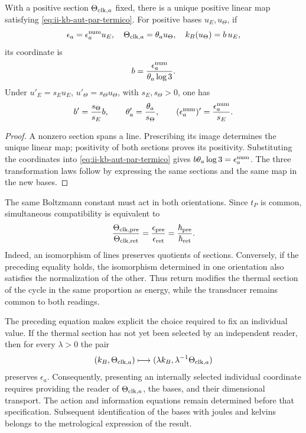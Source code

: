 \begin{samepage}
\begin{theorem}
With a positive section \(\Theta_{{\rm clk},a}\) fixed, there is a
unique positive linear map satisfying
\eqref{eq:ii-kb-aut-par-termico}. For positive bases \(u_E,u_\Theta\),
if
\[
 \epsilon_a=\epsilon_a^{\rm num}u_E,\quad
 \Theta_{{\rm clk},a}=\theta_a u_\Theta,\quad
 k_B(u_\Theta)=b\,u_E,
\]
its coordinate is
\begin{equation}
 b=\frac{\epsilon_a^{\rm num}}{\theta_a\log3}.
 \label{eq:ii-kb-aut-coordenada}
\end{equation}
Under \(u'_E=s_Eu_E\), \(u'_\Theta=s_\Theta u_\Theta\), with
\(s_E,s_\Theta>0\), one has
\[
 b'=\frac{s_\Theta}{s_E}b,\qquad
 \theta'_a=\frac{\theta_a}{s_\Theta},\qquad
 (\epsilon_a^{\rm num})'=\frac{\epsilon_a^{\rm num}}{s_E}.
\]
\end{theorem}
\end{samepage}
\begin{proof}
A nonzero section spans a line. Prescribing its image determines
the unique linear map; positivity of both sections proves
its positivity. Substituting the coordinates into
\eqref{eq:ii-kb-aut-par-termico} gives
\(b\theta_a\log3=\epsilon_a^{\rm num}\). The three transformation
laws follow by expressing the same sections and the same
map in the new bases.
\end{proof}

The same Boltzmann constant must act in both orientations.
Since \(t_P\) is common, simultaneous compatibility is equivalent to
\begin{equation}
 \frac{\Theta_{{\rm clk},{\rm pre}}}{\Theta_{{\rm clk},{\rm ret}}}
 =\frac{\epsilon_{\rm pre}}{\epsilon_{\rm ret}}
 =\frac{\hbar_{\rm pre}}{\hbar_{\rm ret}}.
 \label{eq:ii-kb-aut-orientaciones}
\end{equation}
Indeed, an isomorphism of lines preserves quotients of sections.
Conversely, if the preceding equality holds, the isomorphism
determined in one orientation also satisfies the normalization of
the other. Thus return modifies the thermal section of the cycle in the
same proportion as energy, while the transducer remains
common to both readings.

The preceding equation makes explicit the choice required to fix an
individual value. If the thermal section has not yet been selected
by an independent reader, then for every \(\lambda>0\) the pair
\[
 (k_B,\Theta_{{\rm clk},a})
 \longmapsto(\lambda k_B,\lambda^{-1}\Theta_{{\rm clk},a})
\]
preserves \(\epsilon_a\). Consequently, presenting an
internally selected individual coordinate requires providing the reader of
\(\Theta_{{\rm clk},a}\), the bases, and their dimensional transport.
The action and information equations remain determined before
that specification. Subsequent identification of the bases with
joules and kelvins belongs to the metrological expression of the result.

